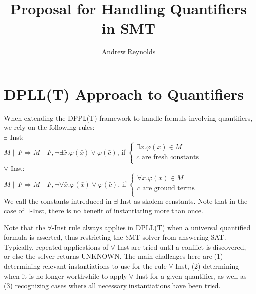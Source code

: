 \documentclass{llncs}
\begin{document}
\title{Proposal for Handling Quantifiers in SMT}

\author{Andrew Reynolds}

\date{}

\maketitle
\thispagestyle{empty}

\section{DPLL(T) Approach to Quantifiers}

When extending the DPPL(T) framework to handle formuls involving quantifiers, we rely on the following rules: \\

\noindent $\exists$-Inst: \\

$M \parallel F \Longrightarrow M \parallel F, \neg \exists \bar{x}. \varphi( \bar{ x } ) \vee \varphi( \bar{ c } )$, if   
$\begin{cases}
  \exists \bar{x}. \varphi( \bar{ x } ) \in M \\
  \bar{ c } \text{ are fresh constants} \\
\end{cases}$ \\

\noindent $\forall$-Inst: \\

$M \parallel F \Longrightarrow M \parallel F, \neg \forall \bar{x}. \varphi( \bar{ x } ) \vee \varphi( \bar{ c } )$, if   
$\begin{cases}
  \forall \bar{x}. \varphi( \bar{ x } ) \in M \\
  \bar{ c } \text{ are ground terms} \\
\end{cases}$ \\

We call the constants introduced in $\exists$-Inst as skolem constants.
Note that in the case of $\exists$-Inst, there is no benefit of instantiating more than once.

Note that the $\forall$-Inst rule always applies in DPLL(T) when a universal quantified formula is asserted, thus restricting the SMT solver from answering SAT.
Typically, repeated applications of $\forall$-Inst are tried until a conflict is discovered, or else the solver returns UNKNOWN.
The main challenges here are (1) determining relevant instantiations to use for the rule $\forall$-Inst, (2) determining when it is no longer worthwhile to apply $\forall$-Inst for a given quantifier, as well as (3) recognizing cases where all necessary instantiations have been tried.
\end{document}
